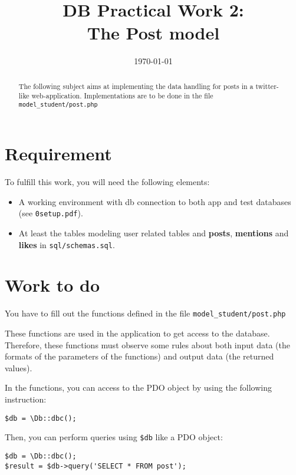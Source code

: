 \documentclass[twoside,a4paper,12pt]{article}
\title{DB Practical Work 2:\\The Post model}
\date{\today}
\begin{document}
\maketitle

\begin{abstract}
  The following subject aims at implementing the data handling for posts in a twitter-like web-application. Implementations are to be done in the file \texttt{model\_student/post.php}
\end{abstract}

\tableofcontents

\clearpage

\section{Requirement}
To fulfill this work, you will need the following elements:

\begin{itemize}
\item A working environment with db connection to both app and test databases (see \texttt{0setup.pdf}).
\item At least the tables modeling user related tables and \textbf{posts}, \textbf{mentions} and \textbf{likes} in \texttt{sql/schemas.sql}.
\end{itemize}

\section{Work to do}
You have to fill out the functions defined in the file \texttt{model\_student/post.php}

These functions are used in the application to get access to the database. Therefore, these functions must observe some rules about both input data (the formats of the parameters of the functions) and output data (the returned values).

In the functions, you can access to the PDO object by using the following instruction:

\begin{lstlisting}
$db = \Db::dbc();
\end{lstlisting}

Then, you can perform queries using \texttt{\$db} like a PDO object:
\begin{lstlisting}
$db = \Db::dbc();
$result = $db->query('SELECT * FROM post');
\end{lstlisting}
\end{document}
